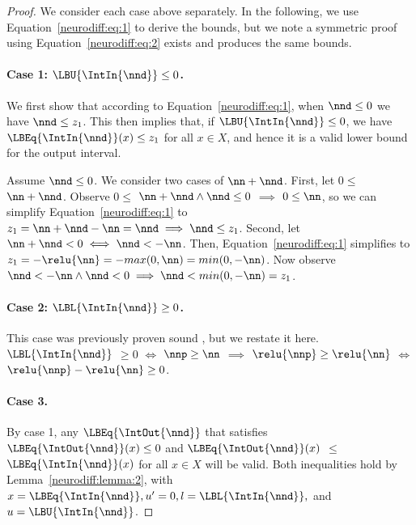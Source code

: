 \begin{proof}
We consider each case above separately. In the following, we use
Equation~\ref{neurodiff:eq:1} to derive the bounds, but we note a symmetric proof
using
Equation~\ref{neurodiff:eq:2} exists and produces the same bounds.

\paragraph{Case 1: $ \LBU{\IntIn{\nnd}} \leq 0 $.}
We first show that according to Equation~\ref{neurodiff:eq:1}, when $ \nnd \leq 0
$ we
have $ \nnd \leq z_1 $. This then implies that, if $ \LBU{\IntIn{\nnd}} \leq 0
$, we have $ \LBEq{\IntIn{\nnd}}(x) \leq z_1 $ for all $ x \in X $, and hence
it is a valid lower bound for the output interval.

Assume $ \nnd \leq 0 $. We consider two cases of $ \nn + \nnd
$. First, let $ 0 \leq $ $ \nn + \nnd $. Observe $ 0 \leq $ $ \nn
+ \nnd \wedge \nnd \leq 0 $ $ \implies $ $ 0 \leq \nn $, so we can
simplify Equation~\ref{neurodiff:eq:1} to $ z_1 = \nn + \nnd - \nn
= \nnd \implies \nnd \leq z_1 $. Second, let $ \nn + \nnd <
0 \iff \nnd < -\nn $. Then, Equation~\ref{neurodiff:eq:1} simplifies to $ z_1 =
- \relu{\nn} = -max(0,\nn) = min(0, -\nn) $. Now observe $ \nnd <
-\nn \wedge \nnd < 0 \implies \nnd < min(0, -\nn) = z_1 $.

\paragraph{Case 2: $ \LBL{\IntIn{\nnd}} \geq 0 $.}
This case was previously proven sound \cite{paulsen2020reludiff}, but we
restate it here.
\\
$ \LBL{\IntIn{\nnd}} $  $ \geq 0 $ $ \iff $ $ \nnp \geq \nn $ $
\implies $ $ \relu{\nnp} \geq \relu{\nn} $ $ \iff $ $ \relu{\nnp} - \relu{\nn}
\geq 0 $.

\paragraph{Case 3.}
By case 1, any $ \LBEq{\IntOut{\nnd}} $ that satisfies
$ \LBEq{\IntOut{\nnd}}(x) \leq 0 $ and $ \LBEq{\IntOut{\nnd}}(x) $
$ \leq $ $ \LBEq{\IntIn{\nnd}}(x) $ for all $ x \in X $ will be valid. Both
inequalities hold by Lemma~\ref{neurodiff:lemma:2}, with $ x =
\LBEq{\IntIn{\nnd}}, u'
= 0, l = \LBL{\IntIn{\nnd}}, $ and $ u = \LBU{\IntIn{\nnd}} $.

\end{proof}


